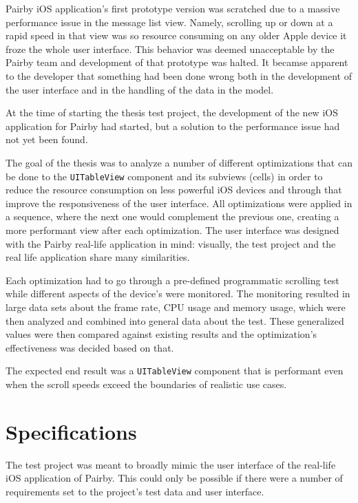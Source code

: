 \documentclass[a4paper,12pt]{article}
\begin{document}
Pairby iOS application's first prototype version was scratched due to a massive performance issue in the message list view. Namely, scrolling up or down at a rapid speed in that view was so resource consuming on any older Apple device it froze the whole user interface. This behavior was deemed unacceptable by the Pairby team and development of that prototype was halted. It becamse apparent to the developer that something had been done wrong both in the development of the user interface and in the handling of the data in the model.

At the time of starting the thesis test project, the development of the new iOS application for Pairby had started, but a solution to the performance issue had not yet been found.

The goal of the thesis was to analyze a number of different optimizations that can be done to the \texttt{UITableView} component and its subviews (cells) in order to reduce the resource consumption on less powerful iOS devices and through that improve the responsiveness of the user interface. All optimizations were applied in a sequence, where the next one would complement the previous one, creating a more performant view after each optimization. The user interface was designed with the Pairby real-life application in mind: visually, the test project and the real life application share many similarities.

Each optimization had to go through a pre-defined programmatic scrolling test while different aspects of the device's were monitored. The monitoring resulted in large data sets about the frame rate, CPU usage and memory usage, which were then analyzed and combined into general data about the test. These generalized values were then compared against existing results and the optimization's effectiveness was decided based on that.

The expected end result was a \texttt{UITableView} component that is performant even when the scroll speeds exceed the boundaries of realistic use cases.

\newpage
\section{Specifications}
The test project was meant to broadly mimic the user interface of the real-life iOS application of Pairby. This could only be possible if there were a number of requirements set to the project's test data and user interface.
\end{document}
